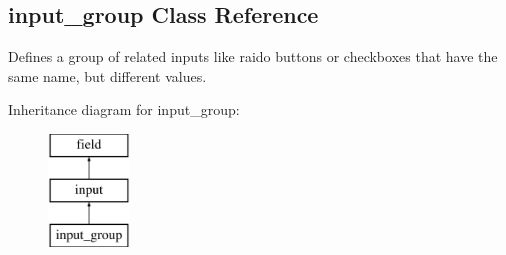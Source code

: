 \hypertarget{classinput__group}{\subsection{input\-\_\-group Class Reference}
\label{classinput__group}
}


Defines a group of related inputs like raido buttons or checkboxes that have the same name, but different values.  


Inheritance diagram for input\-\_\-group\-:\begin{figure}[H]
\begin{center}
\leavevmode
\includegraphics[height=3.000000cm]{classinput__group}
\end{center}
\end{figure}
